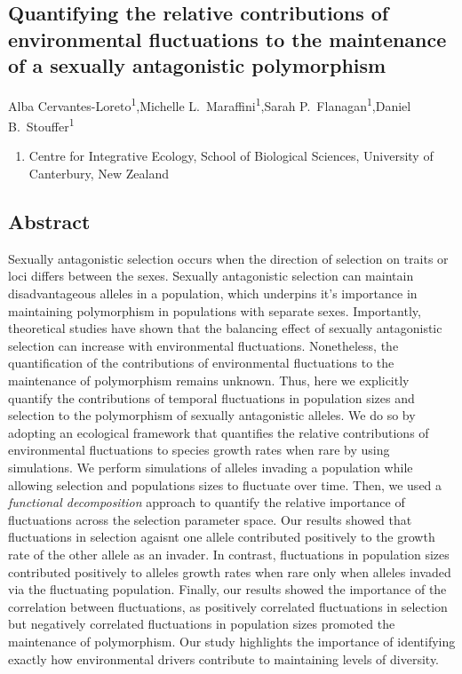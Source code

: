 \begin{refsection}
\chapter{Quantifying the relative contributions of environmental fluctuations to the maintenance of a sexually antagonistic polymorphism} %
\label{Coexistence_alleles}


\noindent Alba Cervantes-Loreto\textsuperscript{1},Michelle L.\ Maraffini\textsuperscript{1},Sarah P.\ Flanagan\textsuperscript{1},Daniel B.\ Stouffer\textsuperscript{1}

\begin{enumerate}
    \item Centre for Integrative Ecology, School of Biological Sciences, University of Canterbury, New Zealand
\end{enumerate}



\section*{Abstract}



Sexually antagonistic selection occurs when the direction of selection on traits or loci differs between the sexes. Sexually antagonistic selection can maintain disadvantageous alleles in a population, which underpins it's importance in maintaining polymorphism in populations with separate sexes. Importantly, theoretical studies have shown that the balancing effect of sexually antagonistic selection can increase with environmental fluctuations. Nonetheless, the quantification of the contributions of environmental fluctuations to the maintenance of polymorphism remains unknown. Thus, here we explicitly quantify the contributions of temporal fluctuations in population sizes and selection to the polymorphism of sexually antagonistic alleles. We do so by adopting an ecological framework that quantifies the relative contributions of environmental fluctuations to species growth rates when rare by using simulations. We perform simulations of alleles invading a population while allowing selection and populations sizes to fluctuate over time. Then, we used  a \textit{functional decomposition} approach to quantify the relative importance of fluctuations across the selection parameter space. Our results showed that fluctuations in selection agaisnt one allele contributed positively to the growth rate of the other allele as an invader. In contrast, fluctuations in population sizes contributed positively to alleles growth rates when rare only when alleles invaded via the fluctuating population. Finally, our results showed the importance of the correlation between fluctuations, as positively correlated fluctuations in selection but negatively correlated fluctuations in population sizes promoted the maintenance of polymorphism. Our study highlights the importance of identifying exactly how environmental drivers contribute to maintaining levels of diversity.


\end{refsection}
